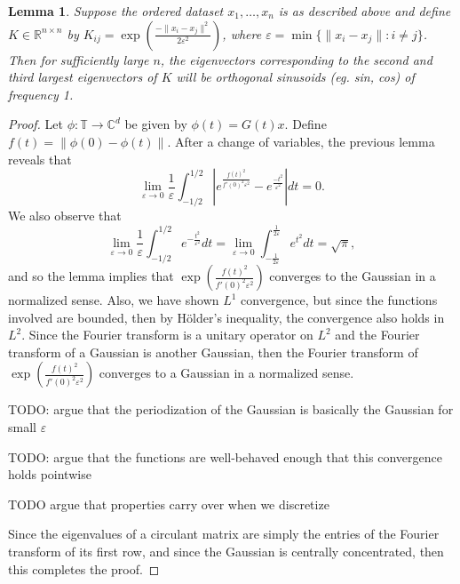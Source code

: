 \documentclass[reqno]{amsart}
\renewcommand{\epsilon}{\varepsilon}
\newtheorem{lemma}{Lemma}
\begin{document}
\begin{lemma}
    Suppose the ordered dataset $x_1, \dots, x_n$ is as described above and define $K \in \mathbb{R}^{n \times n}$ by $K_{ij} = \exp\left(\frac{-\|x_i - x_j\|^2}{2\epsilon^2}\right)$, where $\epsilon = \min\{\|x_i - x_j\| : i \neq j\}$.
    Then for sufficiently large $n$, the eigenvectors corresponding to the second and third largest eigenvectors of $K$ will be orthogonal sinusoids (eg. sin, cos) of frequency 1.
\end{lemma}
\begin{proof}
    
    
    Let $\phi:\mathbb{T}\to\mathbb{C}^d$ be given by $\phi(t) = G(t)x$.
    Define $f(t) = \left\|\phi(0)-\phi(t)\right\|$.
    After a change of variables, the previous lemma reveals that
    \[
    \lim_{\epsilon\to0}
    \frac{1}{\epsilon}\int_{-1/2}^{1/2}
    \left|e^{\frac{f(t)^2}{f'(0)^2\epsilon^2}} - e^{\frac{-t^2}{\epsilon^2}}\right|dt
    =0.
    \]
    We also observe that
    \[
    \lim_{\epsilon\to0}
    \frac{1}{\epsilon}
    \int_{-1/2}^{1/2}e^{-\frac{t^2}{\epsilon^2}}dt
    =
    \lim_{\epsilon\to0}
    \int_{-\frac{1}{2\epsilon}}^{\frac{1}{2\epsilon}}
    e^{t^2}dt
    =\sqrt{\pi},
    \]
    and so the lemma implies that $\exp\left(\frac{f(t)^2}{f'(0)^2\epsilon^2}\right)$ converges to the Gaussian in a normalized sense.
    Also, we have shown $L^1$ convergence, but since the functions involved are bounded, then by H\"older's inequality, the convergence also holds in $L^2$.
    Since the Fourier transform is a unitary operator on $L^2$ and the Fourier transform of a Gaussian is another Gaussian, then the Fourier transform of $\exp\left(\frac{f(t)^2}{f'(0)^2\epsilon^2}\right)$ converges to a Gaussian in a normalized sense.
    
    TODO: argue that the periodization of the Gaussian is basically the Gaussian for small $\epsilon$
    
    TODO: argue that the functions are well-behaved enough that this convergence holds pointwise
    
    TODO argue that properties carry over when we discretize
    
    Since the eigenvalues of a circulant matrix are simply the entries of the Fourier transform of its first row, and since the Gaussian is centrally concentrated, then this completes the proof.
\end{proof}
\end{document}
